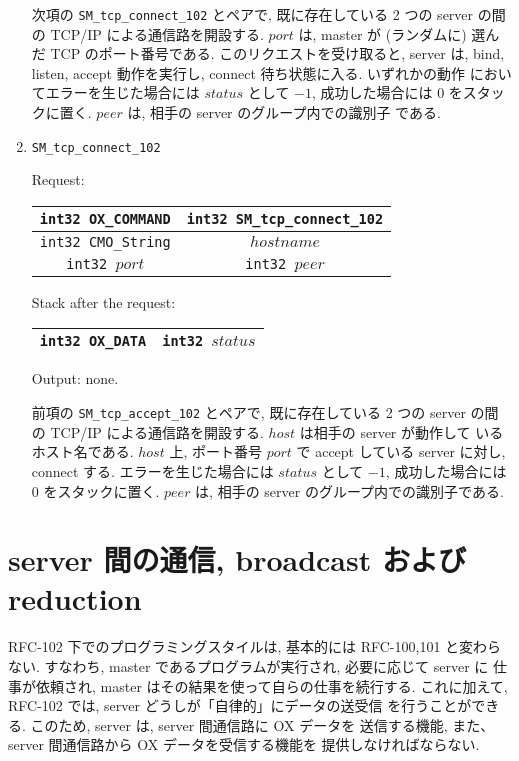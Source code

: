 \documentclass[12pt]{jarticle}
\begin{document}
\begin{enumerate}
次項の {\tt SM\_tcp\_connect\_102} とペアで, 既に存在している 2 つの server 
の間の TCP/IP による通信路を開設する. $port$ は, master が (ランダムに) 選んだ
TCP のポート番号である. このリクエストを受け取ると, server は, 
bind, listen, accept 動作を実行し, connect 待ち状態に入る. いずれかの動作
においてエラーを生じた場合には $status$ として $-1$, 成功した場合には
$0$ をスタックに置く. $peer$ は, 相手の server のグループ内での識別子
である.

\item
\begin{verbatim}
SM_tcp_connect_102
\end{verbatim}

Request:
\begin{tabular}{|c|c|}  \hline
{\tt int32 OX\_COMMAND} & {\tt int32 SM\_tcp\_connect\_102} \\ \hline
{\tt int32 CMO\_String} & {$hostname$} \\ \hline
{\tt int32 $port$} & {\tt int32 $peer$} \\
\hline
\end{tabular}

Stack after the request:
\begin{tabular}{|c|c|}  \hline
{\tt int32 OX\_DATA} & {\tt int32 $status$} \\
\hline
\end{tabular}

Output: none.

前項の {\tt SM\_tcp\_accept\_102} とペアで, 既に存在している 2 つの server
の間の TCP/IP による通信路を開設する. $host$ は相手の server が動作して
いるホスト名である. $host$ 上, ポート番号 $port$ で accept している server に対し,
connect する. 
エラーを生じた場合には $status$ として $-1$, 成功した場合には
$0$ をスタックに置く. $peer$ は, 相手の server のグループ内での識別子である.

\end{enumerate}

\section{server 間の通信, broadcast および reduction}

RFC-102 下でのプログラミングスタイルは, 基本的には RFC-100,101 と変わらない.
すなわち, master であるプログラムが実行され, 必要に応じて server に
仕事が依頼され, master はその結果を使って自らの仕事を続行する.
これに加えて, RFC-102 では, server どうしが「自律的」にデータの送受信
を行うことができる. このため, server は, server 間通信路に OX データを
送信する機能, また、server 間通信路から OX データを受信する機能を
提供しなければならない. 
\end{document}

